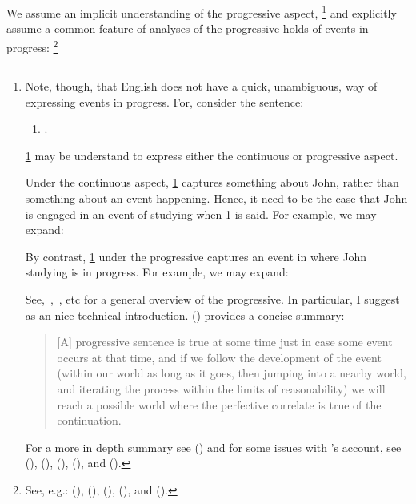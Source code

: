 \begin{note}
  \noindent%
  We assume an implicit understanding of the progressive aspect,%
  \footnote{
    \nocite{Portner:1998um}
    \nocite{Engelberg:1999vi}
    Note, though, that English does not have a quick, unambiguous, way of expressing events in progress.
    For, consider the sentence:
    \begin{enumerate}[label=\arabic*., ref=(\arabic*)]
    \item
      \label{prog:abmig}
      .
    \end{enumerate}
    \ref{prog:abmig} may be understand to express either the continuous or progressive aspect.

    Under the continuous aspect, \ref{prog:abmig} captures something about John, rather than something about an event happening.
    Hence, it need to be the case that John is engaged in an event of studying when \ref{prog:abmig} is said.
    For example, we may expand:

    By contrast, \ref{prog:abmig} under the progressive captures an event in where John studying is in progress.
    For example, we may expand:

    See,~\textcite{Richards:1981wo},~\textcite{Portner:2011vi}, etc for a general overview of the progressive.
    In particular, I suggest \textcite{Landman:1992wh} as an nice technical introduction.
    \citeauthor{Szabo:2004ul} (\citeyear[34]{Szabo:2004ul}) provides a concise summary:
    \begin{quote}
      [A] progressive sentence is true at some time just in case some event occurs at that time, and if we follow the development of the event (within our world as long as it goes, then jumping into a nearby world, and iterating the process within the limits of reasonability) we will reach a possible world where the perfective correlate is true of the continuation.
    \end{quote}
    For a more in depth summary see (\cite[764--766]{Portner:1998um}) and for some issues with \citeauthor{Landman:1992wh}'s account, see
    (\cite{Bonomi:1997uq}),
    (\cite[49--50]{Engelberg:1999vi}),
    (\cite[35]{Szabo:2004ul}),
    (\cite[767]{Portner:1998um}),
    and (\cite[1256]{Portner:2011vi}).
  }
  and explicitly assume a common feature of analyses of the progressive holds of events in progress:%
  \footnote{
    See, e.g.:
    (\cite{Bennett:1972uw}),
    (\cite{Dowty:1979vq}),
    (\cite{Parsons:1990aa}),
    (\cite{Landman:1992wh}), and
    (\cite{Portner:1998um}).

}
\end{note}

